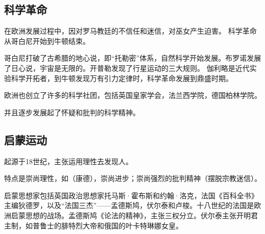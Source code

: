 \subsection{科学革命}
在欧洲发展过程中，因对罗马教廷的不信任和迷信，对巫女产生迫害。
科学革命从哥白尼开始到牛顿结束。

哥白尼打破了古希腊的地心说，即“托勒密”体系，自然科学开始发展。布罗诺发展了日心说，宇宙是无限的。开普勒发现了行星运动的三大规则。
伽利略是近代实验科学开拓者，到牛顿发现万有引力定律时，科学革命发展到鼎盛时期。

欧洲也创立了许多的科学社团，包括英国皇家学会，法兰西学院，德国柏林学院。

并且逐步发展起了怀疑和批判的科学精神。

\subsection{启蒙运动}
起源于18世纪，主张运用理性去发现人。

特点是崇尚理性，如（康德），崇尚进步；崇尚强烈的批判精神（摆脱宗教迷信）。

启蒙思想家包括英国政治思想家托马斯·霍布斯和约翰·洛克，法国《百科全书》主编狄德罗，以及“法国三杰”——孟德斯鸠，伏尔泰和卢梭。十八世纪的法国是欧洲启蒙思想的战场。孟德斯鸠《论法的精神》，主张三权分立。伏尔泰主张开明君主制，如普鲁士的腓特烈大帝和俄国的叶卡特琳娜女皇。







